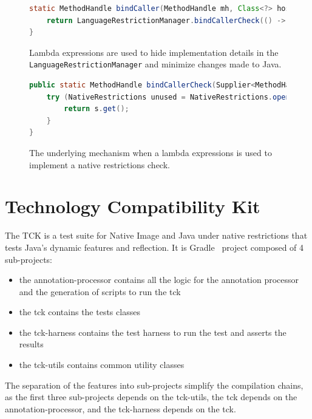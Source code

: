 \begin{figure}[ht]
    \centering
\begin{lstlisting}[language=Java]
static MethodHandle bindCaller(MethodHandle mh, Class<?> hostClass) {
    return LanguageRestrictionManager.bindCallerCheck(() -> BindCaller.bindCaller(mh, hostClass));
}
\end{lstlisting}
    \caption{Lambda expressions are used to hide implementation details in the \texttt{LanguageRestrictionManager} and minimize changes made to Java.}
    \label{fig:bind_caller_lambda}
\end{figure}

\begin{figure}[ht]
    \centering
\begin{lstlisting}[language=Java]
public static MethodHandle bindCallerCheck(Supplier<MethodHandle> s) {
    try (NativeRestrictions unused = NativeRestrictions.openScope()) {
        return s.get();
    }
}
\end{lstlisting}
    \caption{The underlying mechanism when a lambda expressions is used to implement a native restrictions check.}
    \label{fig:bind_caller_lrm}
\end{figure}

\section{Technology Compatibility Kit}\label{TCK}
The TCK is a test suite for Native Image and Java under native restrictions that tests Java's dynamic features and reflection. 
It is Gradle~\cite{noauthor_gradle_2024} project composed of 4 sub-projects: 
\begin{itemize}
    \item the annotation-processor contains all the logic for the annotation processor and the generation of scripts to run the tck
    \item the tck contains the tests classes
    \item the tck-harness contains the test harness to run the test and asserts the results
    \item the tck-utils contains common utility classes
\end{itemize}
The separation of the features into sub-projects simplify the compilation chains, as the first three sub-projects depends on the tck-utils, the tck depends on the annotation-processor, and the tck-harness depends on the tck.

